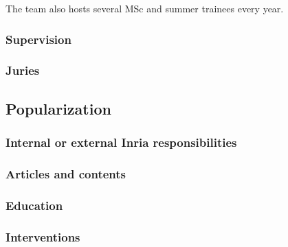  The \team{} team also hosts several MSc and summer trainees every year.
 




\subsubsection{Supervision}
\label{DIVERSE:teaching-supervision}

\subsubsection{Juries}
\label{DIVERSE:teaching-juries}

\subsection{Popularization}
\label{DIVERSE:popularization}

\subsubsection{Internal or external Inria responsibilities}
\label{DIVERSE:popularization-resp}

\subsubsection{Articles and contents}
\label{DIVERSE:popularization-articles}

\subsubsection{Education}
\label{DIVERSE:popularization-education}

\subsubsection{Interventions}
\label{DIVERSE:popularization-intervention}
